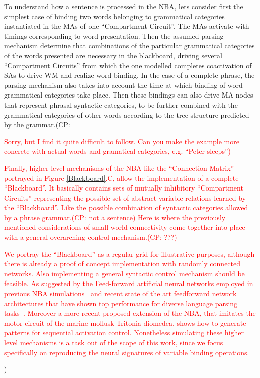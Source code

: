 \documentclass[10pt]{article}
\newcommand{\noteCP}[1]{(CP: \textcolor{red}{#1})}
\begin{document}
To understand how a sentence is processed in the NBA, lets consider first the simplest case of binding two words belonging to grammatical categories instantiated in the MAs of one ``Compartment Circuit''.
The MAs activate with timings corresponding to word presentation.
Then the assumed parsing mechanism determine that combinations of the particular grammatical categories of the words presented are necessary in the blackboard, driving several ``Compartment Circuits'' from which the one modelled completes coactivation of SAs to drive WM and realize word binding.
In the case of a complete phrase, the parsing mechanism also takes into account the time at which binding of word grammatical categories take place.
Then these bindings can also drive MA nodes that represent phrasal syntactic categories, to be further combined with the grammatical categories of other words according to the tree structure predicted by the grammar.\noteCP{Sorry, but I find it quite difficult to follow. Can you make the example more concrete with actual words and gramatical categories, e.g. ``Peter sleeps'')

Finally, higher level mechanisms of the NBA like the ``Connection Matrix'' portrayed in Figure {\ref{Blackboard}}.C, allow the implementation of a complete ``Blackboard''.
It basically contains sets of mutually inhibitory ``Compartment Circuits'' representing the possible set of abstract variable relations learned by the ``Blackboard''.
Like the possible combination of syntactic categories allowed by a phrase grammar.\noteCP{not a sentence}
Here is where the previously mentioned considerations of small world connectivity come together into place with a general overarching control mechanism.\noteCP{???}

We portray the ``Blackboard'' as a regular grid for illustrative purposes, although there is already a proof of concept implementation with randomly connected networks\cite{van_der_Velde_2011}.
Also implementing a general syntactic control mechanism should be feasible. As suggested by the Feed-forward artificial neural networks employed in previous NBA simulations~\cite{van_der_Velde_2010} and recent state of the art feedforward network architectures that have shown top performance for diverse language parsing tasks~\cite{andor2016globally}.
Moreover a more recent proposed extension of the NBA, that imitates the motor circuit of the marine mollusk Tritonia diomedea, shows how to generate patterns for sequential activation control\cite{van_Dijk_2015}.
Nonetheless simulating these higher level mechanisms is a task out of the scope of this work, since we focus specifically on reproducing the neural signatures of variable binding operations.


}
\end{document}
